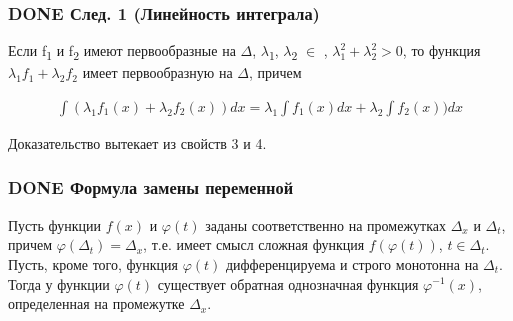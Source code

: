 \documentclass[11pt]{article}
\begin{document}
\subsubsection{{\bfseries\sffamily DONE} След. 1 (Линейность интеграла)}
\label{sec:org7432c55}
Если f\textsubscript{1} и f\textsubscript{2} имеют первообразные на \(\Delta\), \(\lambda\)\textsubscript{1}, \(\lambda\)\textsubscript{2} \(\in\) \R, \(\lambda_1^2+\lambda_2^2>0\), 
то функция \(\lambda_1 f_1+\lambda_2 f_2\) имеет первообразную на \(\Delta\), причем

\begin{eqnarray}
\int(\lambda_1 f_1(x)+\lambda_2 f_2(x))dx=\lambda_1\int f_1(x)dx+\lambda_2\int f_2(x))dx
\end{eqnarray}

Доказательство вытекает из свойств 3 и 4.
\subsubsection{{\bfseries\sffamily DONE} Формула замены переменной}
\label{sec:org45f63ec}
Пусть функции \(f(x)\) и \(\varphi(t)\) заданы соответственно на промежутках \(\Delta_x\) и \(\Delta_t\), 
причем \(\varphi (\Delta_t) = \Delta_x\), т.е. имеет смысл сложная функция \(f(\varphi(t))\), \(t \in \Delta_t\). 
Пусть, кроме того, функция \(\varphi(t)\) дифференцируема и строго монотонна на \(\Delta_t\). Тогда у функции \(\varphi(t)\)
существует обратная однозначная функция \(\varphi^{-1}(x)\), определенная на промежутке \(\Delta_x\).
\end{document}
